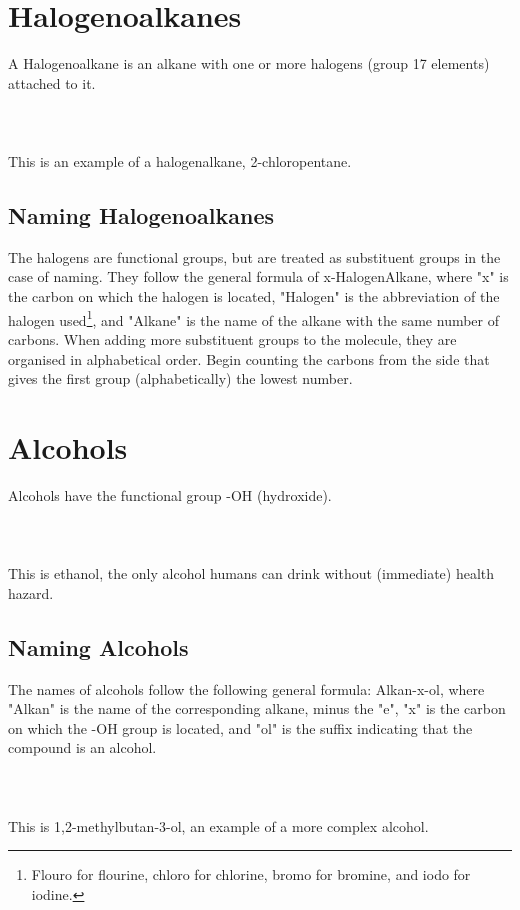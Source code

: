 \documentclass[11pt,twoside]{article}
\begin{document}
	\tableofcontents
	
	\section{Halogenoalkanes}
		A Halogenoalkane is an alkane with one or more halogens (group 17 elements) attached to it.
		\\ \\
		\\ \\
		This is an example of a halogenalkane, 2-chloropentane.
		
		\subsection{Naming Halogenoalkanes}
			The halogens are functional groups, but are treated as substituent groups in the case of naming. They follow the general formula of x-HalogenAlkane, where "x" is the carbon on which the halogen is located, "Halogen" is the abbreviation of the halogen used\footnote{Flouro for flourine, chloro for chlorine, bromo for bromine, and iodo for iodine.}, and "Alkane" is the name of the alkane with the same number of carbons. When adding more substituent groups to the molecule, they are organised in alphabetical order. Begin counting the carbons from the side that gives the first group (alphabetically) the lowest number.
			
	\section{Alcohols}
		Alcohols have the functional group -OH (hydroxide).
		\\ \\
		\\ \\
		This is ethanol, the only alcohol humans can drink without (immediate) health hazard.
		\subsection{Naming Alcohols}
			The names of alcohols follow the following general formula: Alkan-x-ol, where "Alkan" is the name of the corresponding alkane, minus the "e", "x" is the carbon on which the -OH group is located, and "ol" is the suffix indicating that the compound is an alcohol.
			\\ \\
			\\ \\
			This is 1,2-methylbutan-3-ol, an example of a more complex alcohol.
\end{document}
